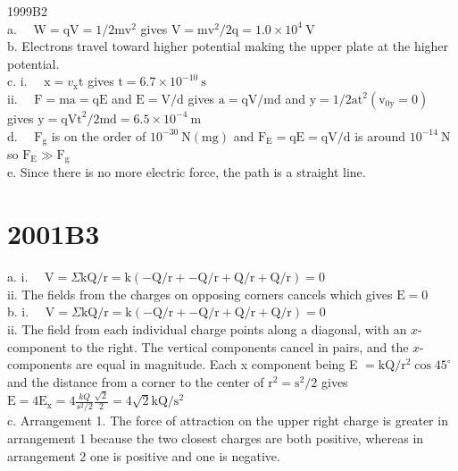 \begin{enumerate}
1999B2\\
a. $\quad \mathrm{W}=\mathrm{qV}=1 / 2 \mathrm{mv}^{2}$ gives $\mathrm{V}=\mathrm{mv}^{2} / 2 \mathrm{q}=1.0 \times 10^{4} \mathrm{~V}$\\
b. Electrons travel toward higher potential making the upper plate at the higher potential.\\
c. i. $\quad \mathrm{x}=v_{\mathrm{x}} \mathrm{t}$ gives $\mathrm{t}=6.7 \times 10^{-10} \mathrm{~s}$\\
ii. $\quad \mathrm{F}=\mathrm{ma}=\mathrm{qE}$ and $\mathrm{E}=\mathrm{V} / \mathrm{d}$ gives $\mathrm{a}=\mathrm{qV} / \mathrm{md}$ and $\mathrm{y}=1 / 2 \mathrm{at}^{2}\left(\mathrm{v}_{0 \mathrm{y}}=0\right)$ gives $\mathrm{y}=\mathrm{qVt}^{2} / 2 \mathrm{md}=6.5 \times 10^{-4} \mathrm{~m}$\\
d. $\quad \mathrm{F}_{\mathrm{g}}$ is on the order of $10^{-30} \mathrm{~N}(\mathrm{mg})$ and $\mathrm{F}_{\mathrm{E}}=\mathrm{qE}=\mathrm{qV} / \mathrm{d}$ is around $10^{-14} \mathrm{~N}$ so $\mathrm{F}_{\mathrm{E}} \gg \mathrm{F}_{\mathrm{g}}$\\
e. Since there is no more electric force, the path is a straight line.

\section*{2001B3}
a. i. $\quad \mathrm{V}=\Sigma \mathrm{k} \mathrm{Q} / \mathrm{r}=\mathrm{k}(-\mathrm{Q} / \mathrm{r}+-\mathrm{Q} / \mathrm{r}+\mathrm{Q} / \mathrm{r}+\mathrm{Q} / \mathrm{r})=0$\\
ii. The fields from the charges on opposing corners cancels which gives $\mathrm{E}=0$\\
b. i. $\quad \mathrm{V}=\Sigma \mathrm{k} \mathrm{Q} / \mathrm{r}=\mathrm{k}(-\mathrm{Q} / \mathrm{r}+-\mathrm{Q} / \mathrm{r}+\mathrm{Q} / \mathrm{r}+\mathrm{Q} / \mathrm{r})=0$\\
ii. The field from each individual charge points along a diagonal, with an $x$-component to the right. The vertical components cancel in pairs, and the $x$-components are equal in magnitude. Each x component being E $=\mathrm{kQ} / \mathrm{r}^{2} \cos 45^{\circ}$ and the distance from a corner to the center of $\mathrm{r}^{2}=\mathrm{s}^{2} / 2$ gives\\
$\mathrm{E}=4 \mathrm{E}_{\mathrm{x}}=4 \frac{k Q}{s^{2} / 2} \frac{\sqrt{2}}{2}=4 \sqrt{2} \mathrm{kQ} / \mathrm{s}^{2}$\\
c. Arrangement 1. The force of attraction on the upper right charge is greater in arrangement 1 because the two closest charges are both positive, whereas in arrangement 2 one is positive and one is negative.


\end{enumerate}
